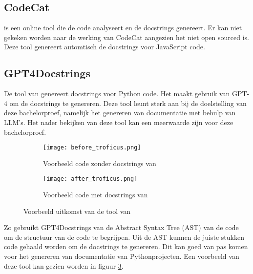 \subsection{CodeCat}
\textcite{CodeCat2024} is een online tool die de code analyseert en de docstrings genereert. Er kan niet gekeken worden naar de werking van CodeCat aangezien het niet open sourced is.
Deze tool genereert automtisch de docstrings voor JavaScript code.

\subsection{GPT4Docstrings}
De tool van \textcite{Trofficus2023} genereert docstrings voor Python code. Het maakt gebruik van GPT-4 \autocite{OpenAI2023} om de docstrings te genereren.
Deze tool leunt sterk aan bij de doelstelling van deze bachelorproef, namelijk het genereren van documentatie met behulp van LLM's.
Het nader bekijken van deze tool kan een meerwaarde zijn voor deze bachelorproef.

\begin{figure}
  \centering
  \begin{subfigure}[b]{0.5\textwidth}
      \centering
      \texttt{[image: before\_troficus.png]}
      \caption{Voorbeeld code zonder docstrings van \textcite{Trofficus2023}}
      \label{fig:before-Trofficus}
  \end{subfigure}
  \hfill
  \begin{subfigure}[b]{0.5\textwidth}
      \centering
      \texttt{[image: after\_troficus.png]}
      \caption{Voorbeeld code met docstrings van \textcite{Trofficus2023}}
      \label{fig:after-Trofficus}
  \end{subfigure}
     \caption[Uitkomst GPT4Docstrings]{Voorbeeld uitkomst van de tool van \textcite{Trofficus2023}}
     \label{fig:Before-After-Trofficus}
\end{figure}

Zo gebruikt GPT4Docstrings van \textcite{Trofficus2023} de Abstract Syntax Tree (AST) van de code om de structuur van de code te begrijpen.
Uit de AST kunnen de juiste stukken code gehaald worden om de docstrings te genereren.
Dit kan goed van pas komen voor het genereren van documentatie van Pythonprojecten.
Een voorbeeld van deze tool kan gezien worden in figuur \ref{fig:Before-After-Trofficus}. 


